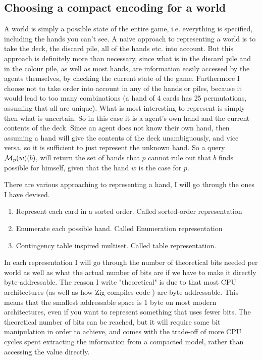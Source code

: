\subsection{Choosing a compact encoding for a world} \label{sec:representing-a-world}
A world is simply a possible state of the entire game, i.e. everything is specified, including the hands you can't see.
A naive approach to representing a world is to take the deck, the discard pile, all of the hands etc. into account.
But this approach is definitely more than necessary, since what is in the discard pile and in the colour pile, as well as most hands, are information easily accessed by the agents themselves, by checking the current state of the game.
Furthermore I choose not to take order into account in any of the hands or piles, because it would lead to too many combinations (a hand of 4 cards has 25 permutations, assuming that all are unique).
What is most interesting to represent is simply then what is uncertain.
So in this case it is a agent's own hand and the current contents of the deck.
Since an agent does not know their own hand, then assuming a hand will give the contents of the deck unambiguously, and vice versa, so it is sufficient to just represent the unknown hand.
So a query $\mathcal{M}_p(w)(b)$, will return the set of hands that $p$ cannot rule out that $b$ finds possible for himself, given that the hand $w$ is the case for $p$.

There are various approaching to representing a hand, I will go through the ones I have devised. 

\begin{enumerate}
\item Represent each card in a sorted order. Called sorted-order representation
\item Enumerate each possible hand. Called Enumeration representation
\item Contingency table inspired multiset. Called table representation.
\end{enumerate}

In each representation I will go through the number of theoretical bits needed per world as well as what the actual number of bits are if we have to make it directly byte-addressable.
The reason I write "theoretical" is due to that most CPU architectures (as well as how Zig compiles code \cite{zigdocspackedstruct}) are byte-addressable.
This means that the smallest addressable space is 1 byte on most modern architectures, even if you want to represent something that uses fewer bits.
The theoretical number of bits can be reached, but it will require some bit manipulation in order to achieve, and comes with the trade-off of more CPU cycles spent extracting the information from a compacted model, rather than accessing the value directly. 


